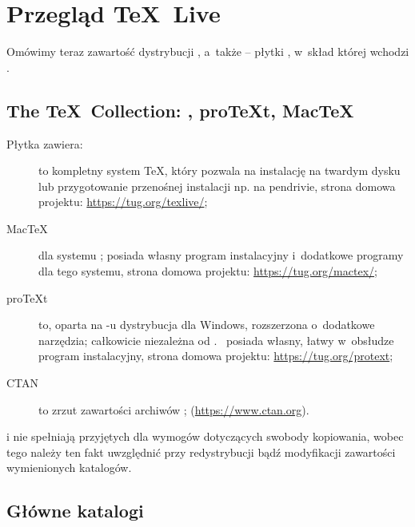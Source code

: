 \documentclass{article}
\begin{document}
\section{Przegląd \protect\TeX\protect\ Live}
\label{sec:overview-tl}

Omówimy teraz zawartość dystrybucji \TL{}, a~także \TK{} --
płytki \DVD, w~skład której wchodzi \TL.

\subsection{The \protect\TeX\protect\ Collection: \protect\TL, pro\protect\TeX{}t, Mac\protect\TeX}
\label{sec:tl-coll-dists}

Płytka \TK{} \DVD{} zawiera:

\begin{description}

\item [\TL] to kompletny system \TeX, który pozwala na instalację na
twardym dysku lub przygotowanie przenośnej instalacji np. na pendrivie,
strona domowa projektu: \url{https://tug.org/texlive/};

\item [Mac\TeX] dla systemu \MacOSX; posiada własny program instalacyjny
i~dodatkowe programy dla tego systemu, strona domowa projektu:
\url{https://tug.org/mactex/};

\item [pro\TeX{}t] to, oparta na  \MIKTEX-u dystrybucja dla Windows,
rozszerzona o~dodatkowe narzędzia; całkowicie niezależna od \TL.
\ProTeXt\ posiada własny, łatwy w~obsłudze program instalacyjny,
 strona domowa projektu: \url{https://tug.org/protext};

\item [CTAN] to zrzut zawartości archiwów \CTAN{};
(\url{https://www.ctan.org}).

\end{description}

\CTAN i  nie spełniają przyjętych dla
\TL{} wymogów dotyczących swobody kopiowania, wobec tego należy ten fakt
uwzględnić przy redystrybucji bądź modyfikacji zawartości wymienionych
katalogów.

\subsection{Główne katalogi \protect\TL}
\label{sec:tld}
\end{document}
